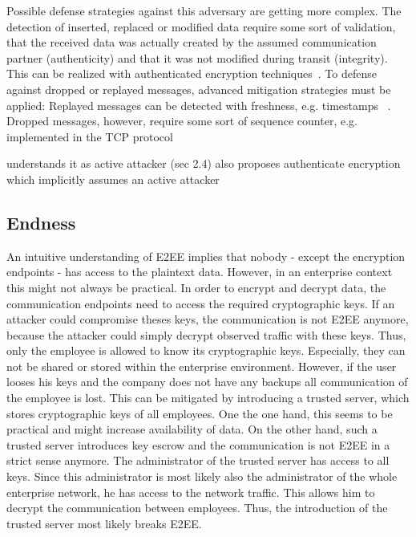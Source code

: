 \documentclass[../main.tex]{subfiles}
\begin{document}
Possible defense strategies against this adversary are getting more complex.
The detection of inserted, replaced or modified data require some sort of validation, that the received data was actually created by the assumed communication partner (authenticity) and that it was not modified during transit (integrity).
This can be realized with authenticated encryption techniques~\cite{Mallory2022}.
To defense against dropped or replayed messages, advanced mitigation strategies must be applied:
Replayed messages can be detected with freshness, e.g. timestamps ~\cite[419]{Eckert2018}.
Dropped messages, however, require some sort of sequence counter, e.g. implemented in the TCP protocol ~\cite[115]{Eckert2018}

\cite{Mallory2022} understands it as active attacker (sec 2.4)
\cite{Hale2022} also proposes authenticate encryption which implicitly assumes an active attacker


\subsection{Endness}

An intuitive understanding of E2EE implies that nobody - except the encryption endpoints - has access to the plaintext data.
However, in an enterprise context this might not always be practical.
In order to encrypt and decrypt data, the communication endpoints need to access the required cryptographic keys.
If an attacker could compromise theses keys, the communication is not E2EE anymore, because the attacker could simply decrypt observed traffic with these keys.
Thus, only the employee is allowed to know its cryptographic keys.
Especially, they can not be shared or stored within the enterprise environment.
However, if the user looses his keys and the company does not have any backups all communication of the employee is lost.
This can be mitigated by introducing a trusted server, which stores cryptographic keys of all employees.
One the one hand, this seems to be practical and might increase availability of data. 
On the other hand, such a trusted server introduces key escrow and the communication is not E2EE in a strict sense anymore.
The administrator of the trusted server has access to all keys.
Since this administrator is most likely also the administrator of the whole enterprise network, he has access to the network traffic.
This allows him to decrypt the communication between employees.
Thus, the introduction of the trusted server most likely breaks E2EE.
\end{document}
